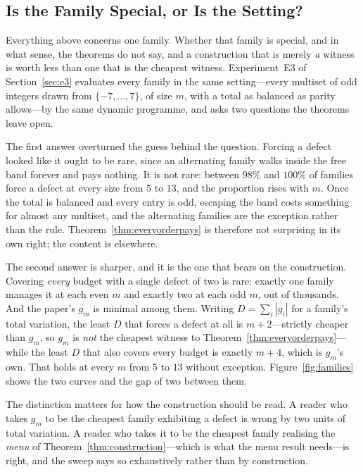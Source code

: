 \subsection{Is the Family Special, or Is the Setting?}
\label{sec:families}

Everything above concerns one family. Whether that family is special, and in what
sense, the theorems do not say, and a construction that is merely \emph{a} witness
is worth less than one that is the cheapest witness. Experiment~E3 of
Section~\ref{sec:e3} evaluates every family in the same setting---every multiset of
odd integers drawn from $\{-7,\dots,7\}$, of size $m$, with a total as balanced as
parity allows---by the same dynamic programme, and asks two questions the
theorems leave open.

The first answer overturned the guess behind the question. Forcing a defect looked
like it ought to be rare, since an alternating family walks inside the free band
forever and pays nothing. It is not rare: between $98\%$ and $100\%$ of families
force a defect at every size from $5$ to $13$, and the proportion rises with $m$.
Once the total is balanced and every entry is odd, escaping the band costs
something for almost any multiset, and the alternating families are the exception
rather than the rule. Theorem~\ref{thm:everyorderpays} is therefore not surprising
in its own right; the content is elsewhere. \NUM{}

The second answer is sharper, and it is the one that bears on the construction.
Covering \emph{every} budget with a single defect of two is rare: exactly one
family manages it at each even $m$ and exactly two at each odd $m$, out of
thousands. And the paper's $g_{m}$ is minimal among them. Writing
$D=\sum_{i}|g_{i}|$ for a family's total variation, the least $D$ that forces a
defect at all is $m+2$---strictly cheaper than $g_{m}$, so $g_{m}$ is \emph{not}
the cheapest witness to Theorem~\ref{thm:everyorderpays}---while the least $D$
that also covers every budget is exactly $m+4$, which is $g_{m}$'s own. That holds
at every $m$ from $5$ to $13$ without exception. Figure~\ref{fig:families} shows
the two curves and the gap of two between them. \NUM{}

The distinction matters for how the construction should be read. A reader who
takes $g_{m}$ to be the cheapest family exhibiting a defect is wrong by two units
of total variation. A reader who takes it to be the cheapest family realising the
\emph{menu} of Theorem~\ref{thm:construction}---which is what the menu result
needs---is right, and the sweep says so exhaustively rather than by construction.

